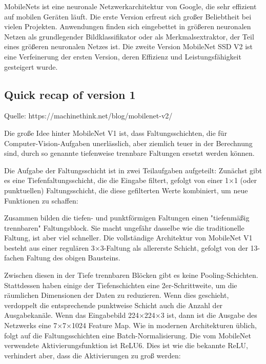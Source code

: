 
MobileNets ist eine neuronale Netzwerkarchitektur von Google, die sehr effizient auf mobilen Geräten läuft. Die erste Version erfreut sich großer Beliebtheit bei vielen
Projekten. Anwendungen finden sich eingebettet in größeren neuronalen Netzen  als grundlegender Bildklassifikator oder als Merkmalsextraktor, der Teil eines größeren neuronalen Netzes ist. Die zweite Version MobileNet SSD V2 ist eine Verfeinerung 
der ersten Version, deren Effizienz und Leistungsfähigkeit gesteigert wurde. \cite{MobileNet:2018}


\subsection{Quick recap of version 1}

{\tiny Quelle: https://machinethink.net/blog/mobilenet-v2/}

Die große Idee hinter MobileNet V1 ist, dass Faltungsschichten, die für Computer-Vision-Aufgaben unerlässlich, aber ziemlich teuer in der Berechnung sind, durch so genannte tiefenweise trennbare Faltungen ersetzt werden können. \cite{MobileNet:2017}

Die Aufgabe der Faltungsschicht ist in zwei Teilaufgaben aufgeteilt: Zunächst gibt es eine Tiefenfaltungsschicht, die die Eingabe filtert, gefolgt von einer 1×1 (oder punktuellen) Faltungsschicht, die diese gefilterten Werte kombiniert, um neue Funktionen zu schaffen:



Zusammen bilden die tiefen- und punktförmigen Faltungen einen "tiefenmäßig trennbaren" Faltungsblock. Sie macht ungefähr dasselbe wie die traditionelle Faltung, ist aber viel schneller.
Die vollständige Architektur von MobileNet V1 besteht aus einer regulären 3×3-Faltung als allererste Schicht, gefolgt von der 13-fachen Faltung des obigen Bausteins.

Zwischen diesen in der Tiefe trennbaren Blöcken gibt es keine Pooling-Schichten. Stattdessen haben einige der Tiefenschichten eine 2er-Schrittweite, um die räumlichen Dimensionen der Daten zu reduzieren. Wenn dies geschieht, verdoppelt die entsprechende punktweise Schicht auch die Anzahl der Ausgabekanäle. Wenn das Eingabebild 224×224×3 ist, dann ist die Ausgabe des Netzwerks eine 7×7×1024 Feature Map.
Wie in modernen Architekturen üblich, folgt auf die Faltungsschichten eine Batch-Normalisierung. Die vom MobileNet verwendete Aktivierungsfunktion ist ReLU6. Dies ist wie die bekannte ReLU, verhindert aber, dass die Aktivierungen zu groß werden:

